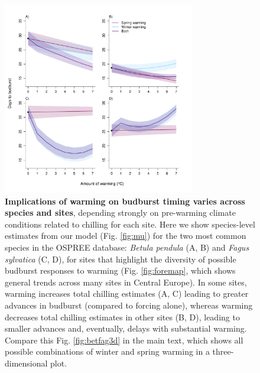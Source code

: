 \documentclass{article}
\begin{document}
\begin{figure}[hp!]
\centering
\noindent \includegraphics[width=0.75\textwidth]{..//..//analyses/bb_analysis/figures/forecasting/tempforecastbothspp_1_7_degwarm.pdf}
\caption{\textbf{Implications of warming on budburst timing varies across species and sites}, depending strongly on pre-warming climate conditions related to chilling for each site. Here we show species-level estimates from our model (Fig. \ref{fig:mu}) for the two most common species in the OSPREE database: \emph{Betula pendula} (A, B) and \emph{Fagus sylvatica} (C, D), for sites that highlight the diversity of possible budburst responses to warming (Fig. \ref{fig:foremap}, which shows general trends across many sites in Central Europe). In some sites, warming increases total chilling estimates (A, C) leading to greater advances in budburst (compared to forcing alone), whereas warming decreases total chilling estimates in other sites (B, D), leading to smaller advances and, eventually, delays with substantial warming. Compare this Fig. \ref{fig:betfag3d} in the main text, which shows all possible combinations of winter and spring warming in a three-dimensional plot.}
\label{fig:betfag2d}
\end{figure}
\end{document}
